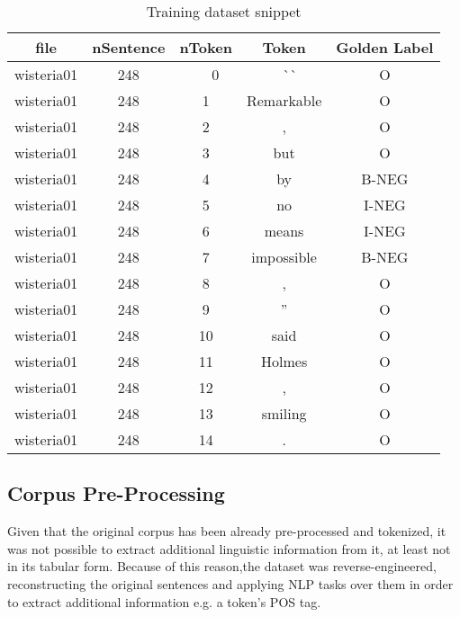 \begin{table}
\centering
\begin{tabular}{ccccc}
file       & nSentence & nToken & Token        & Golden Label  \\ 
\hline
wisteria01 & 248       & ~ ~0   & ~ ~\`{}\`{}~ & O             \\
wisteria01 & 248       & 1      & Remarkable   & O             \\
wisteria01 & 248       & 2      & ,            & O             \\
wisteria01 & 248       & 3      & but          & O             \\
wisteria01 & 248       & 4      & by           & B-NEG         \\
wisteria01 & 248       & 5      & no           & I-NEG         \\
wisteria01 & 248       & 6      & means        & I-NEG         \\
wisteria01 & 248       & 7      & impossible   & B-NEG         \\
wisteria01 & 248       & 8      & ,            & O             \\
wisteria01 & 248       & 9      & ''           & O             \\
wisteria01 & 248       & 10     & said         & O             \\
wisteria01 & 248       & 11     & Holmes       & O             \\
wisteria01 & 248       & 12     & ,            & O             \\
wisteria01 & 248       & 13     & smiling      & O             \\
wisteria01 & 248       & 14     & .            & O             \\
\hline
\end{tabular}
\caption{\label{tab:trainingdf}Training dataset snippet}
\end{table}
 



\subsection*{Corpus Pre-Processing}

Given that the original corpus has been already pre-processed and tokenized, it was not possible to extract additional linguistic information from it, at least not in its tabular form. Because of this reason,the dataset was reverse-engineered, reconstructing the original sentences and applying NLP tasks over them in order to extract additional information e.g. a token's POS tag. 

